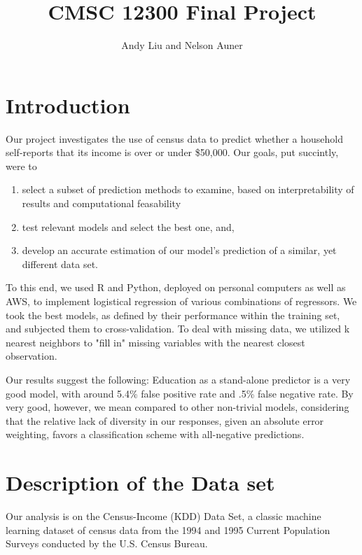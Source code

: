 \documentclass[11pt]{article}
\title{CMSC 12300 Final Project}
\author{Andy Liu and Nelson Auner}
\begin{document}
\maketitle
\section{Introduction}

Our project investigates the use of census data to  predict whether a household self-reports that its income is over or under \$50,000. Our goals, put succintly, were to

\begin{enumerate}
  \item select  a subset of prediction methods to examine, based on interpretability of results and computational feasability
  \item test relevant models and select the best one, and,
  \item develop an accurate estimation of our model's prediction of a similar, yet different data set.
\end{enumerate}
 

To this end, we used R and Python, deployed on personal computers as well as AWS, to implement logistical regression of various combinations of regressors. We took the best models, as defined by their performance within the training set, and subjected them to cross-validation. To deal with missing data, we utilized k nearest neighbors to "fill in" missing variables with the nearest closest observation.

Our results suggest the following: Education as a stand-alone predictor is a very good model, with around 5.4\% false positive rate and .5\% false negative rate. By very good, however, we mean compared to other non-trivial models, considering that the relative lack of diversity in our responses, given an absolute error weighting, favors a classification scheme with all-negative predictions. 


\section{Description of the Data set}
Our analysis is on the Census-Income (KDD) Data Set, a classic machine learning dataset of census data from the 1994 and 1995 Current Population Surveys conducted by the U.S. Census Bureau.

\end{document}

